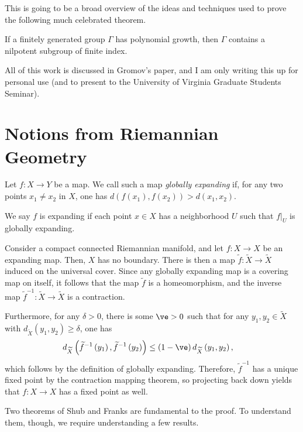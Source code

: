 \documentclass[10pt]{mypackage}
\begin{document}
\RaggedRight
This is going to be a broad overview of the ideas and techniques used to prove the following much celebrated theorem.
\begin{theorem}
  If a finitely generated group $\Gamma$ has polynomial growth, then $\Gamma$ contains a nilpotent subgroup of finite index.
\end{theorem}
All of this work is discussed in Gromov's paper, and I am only writing this up for personal use (and to present to the University of Virginia Graduate Students Seminar).
\section{Notions from Riemannian Geometry}%
\begin{definition}
  Let $f\colon X\rightarrow Y$ be a map. We call such a map \textit{globally expanding} if, for any two points $x_1\neq x_2$ in $X$, one has $d\left( f\left( x_1 \right),f\left( x_2 \right) \right) > d\left( x_1,x_2 \right)$.

  We say $f$ is expanding if each point $x\in X$ has a neighborhood $U$ such that $f|_{U}$ is globally expanding.
\end{definition}
Consider a compact connected Riemannian manifold, and let $f\colon X\to X$ be an expanding map. Then, $X$ has no boundary. There is then a map $ \widetilde{f}\colon \widetilde{X}\rightarrow \widetilde{X} $ induced on the universal cover. Since any globally expanding map is a covering map on itself, it follows that the map $ \widetilde{f} $ is a homeomorphism, and the inverse map $ \widetilde{f}^{-1}\colon \widetilde{X}\rightarrow \widetilde{X} $ is a contraction.

Furthermore, for any $\delta > 0$, there is some $\ve > 0$ such that for any $y_1,y_2\in \widetilde{X}$ with $d_{\widetilde{X}}\left( y_1,y_2 \right) \geq \delta$, one has
\begin{align*}
  d_{\widetilde{X}} \left( \widetilde{f}^{-1}\left( y_1 \right),\widetilde{f}^{-1}\left( y_2 \right) \right) &\leq \left( 1-\ve \right)d_{\widetilde{X}} \left( y_1,y_2 \right),
\end{align*}
which follows by the definition of globally expanding. Therefore, $ \widetilde{f}^{-1} $ has a unique fixed point by the contraction mapping theorem, so projecting back down yields that $f\colon X\rightarrow X$ has a fixed point as well.

Two theorems of Shub and Franks are fundamental to the proof. To understand them, though, we require understanding a few results.
\nocite{gromov_polynomial_growth_paper,van_den_dries_wilkie_paper}
\printbibliography
\end{document}
